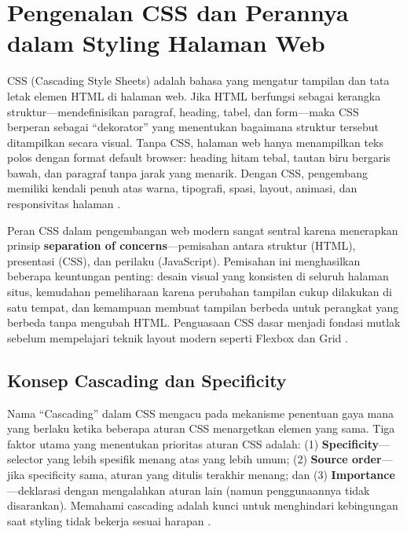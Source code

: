 \section{Pengenalan CSS dan Perannya dalam Styling Halaman Web}

CSS (Cascading Style Sheets) adalah bahasa yang mengatur tampilan dan tata letak elemen HTML di halaman web. Jika HTML berfungsi sebagai kerangka struktur---mendefinisikan paragraf, heading, tabel, dan form---maka CSS berperan sebagai ``dekorator'' yang menentukan bagaimana struktur tersebut ditampilkan secara visual. Tanpa CSS, halaman web hanya menampilkan teks polos dengan format default browser: heading hitam tebal, tautan biru bergaris bawah, dan paragraf tanpa jarak yang menarik. Dengan CSS, pengembang memiliki kendali penuh atas warna, tipografi, spasi, layout, animasi, dan responsivitas halaman \cite{mdnCss}.

Peran CSS dalam pengembangan web modern sangat sentral karena menerapkan prinsip \textbf{separation of concerns}---pemisahan antara struktur (HTML), presentasi (CSS), dan perilaku (JavaScript). Pemisahan ini menghasilkan beberapa keuntungan penting: desain visual yang konsisten di seluruh halaman situs, kemudahan pemeliharaan karena perubahan tampilan cukup dilakukan di satu tempat, dan kemampuan membuat tampilan berbeda untuk perangkat yang berbeda tanpa mengubah HTML. Penguasaan CSS dasar menjadi fondasi mutlak sebelum mempelajari teknik layout modern seperti Flexbox dan Grid \cite{webdevCss}.

\subsection{Konsep Cascading dan Specificity}

Nama ``Cascading'' dalam CSS mengacu pada mekanisme penentuan gaya mana yang berlaku ketika beberapa aturan CSS menargetkan elemen yang sama. Tiga faktor utama yang menentukan prioritas aturan CSS adalah: (1) \textbf{Specificity}---selector yang lebih spesifik menang atas yang lebih umum; (2) \textbf{Source order}---jika specificity sama, aturan yang ditulis terakhir menang; dan (3) \textbf{Importance}---deklarasi dengan  mengalahkan aturan lain (namun penggunaannya tidak disarankan). Memahami cascading adalah kunci untuk menghindari kebingungan saat styling tidak bekerja sesuai harapan \cite{webdevCss}.

